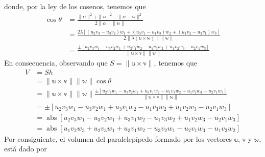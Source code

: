 donde, por la ley de los cosenos, tenemos que
\begin{align*}
    \cos \theta & = \frac{\|\alpha\|^2 + \| \mathbb{w} \|^2-\|\alpha - \mathbb{w} \|^2}{2 \|\alpha\| \| \mathbb{w} \|} \\
    & = \frac{2 \lambda\left[\left(u_2 v_3-u_3 v_2\right) w_1+\left(u_3 v_1-u_1 v_3\right) w_2+\left(u_1 v_2-u_2 v_1\right) w_3\right]}{2\|\lambda(\mathbb{u} \times \mathbb{w})\| \| \mathbb{w} \|} \\
    & = \frac{ \pm\left[u_2 v_3 w_1-u_3 v_2 w_1+u_3 v_1 w_2-u_1 v_3 w_2+u_1 v_2 w_3-u_2 v_1 w_3\right]}{\|\mathbb{u} \times \mathbb{v}\|\| \mathbb{w} \|}
\end{align*}
En consecuencia, observando que $S=\|\mathbb{u} \times \mathbb{v}\|$, tenemos que
\begin{align*}
    V & = S h \\
    & = \|\mathbb{u} \times \mathbb{v}\|\| \mathbb{w} \| \cos \theta \\ 
    & = \|\mathbb{u} \times \mathbb{v}\|\| \mathbb{w} \| \frac{ \pm\left[u_2 v_3 w_1-u_3 v_2 w_1+u_3 v_1 w_2-u_1 v_3 w_2+u_1 v_2 w_3-u_2 v_1 w_3\right]}{\|\mathbb{u} \times \mathbb{v}\|\| \mathbb{w} \|} \\
    & = \pm\left[u_2 v_3 w_1-u_3 v_2 w_1+u_3 v_1 w_2-u_1 v_3 w_2+u_1 v_2 w_3-u_2 v_1 w_3\right] \\
    & = \operatorname{abs} \left[u_2 v_3 w_1-u_3 v_2 w_1+u_3 v_1 w_2-u_1 v_3 w_2+u_1 v_2 w_3-u_2 v_1 w_3\right] \\
    & = \operatorname{abs}\left[u_1 v_2 w_3+u_2 v_3 w_1+u_3 v_1 w_2-u_3 v_2 w_1-u_2 v_1 w_3-u_1 v_3 w_2\right]
\end{align*}
Por consiguiente, el volumen del paralelepípedo formado por los vectores $\mathbb{u}$, $\mathbb{v}$ y $\mathbb{w}$, está dado por
\begin{matrizn}
\end{matrizn}

